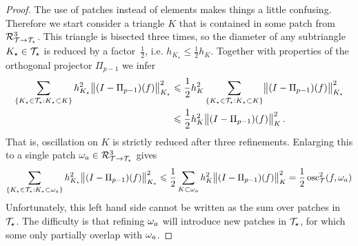 \documentclass[thesis.tex]{subfiles}
\begin{document}
\begin{proof}

  The use of patches instead of elements makes things a little confusing. %
  Therefore we start consider a triangle $K$ that is contained in some patch from $\mathcal{R}^3_{\mathcal{T} \to \mathcal{T}_\star}$.
  This triangle is bisected three times, so the diameter of any subtriangle $K_\star \in \mathcal{T}_\star$  is reduced by a factor~$\frac{1}{2}$, i.e. $h_{K_\star} \leq \frac{1}{2} h_K$.
  Together with properties of the orthogonal projector $\Pi_{p-1}$ we infer
  \begin{equation}
    \label{eq:strictosc}
  \begin{aligned}
    \sum_{\set{K_\star \in \mathcal{T}_\star : K_\star \subset K}} h^2_{K_\star} \norm{(I - \Pi_{p-1})(f)}^2_{K_\star} &\leqslant \frac{1}{2}h^2_K \sum_{\set{K_\star \in \mathcal{T}_\star : K_\star \subset K}} \norm{(I - \Pi_{p-1})(f)}^2_{K_\star} \\
    &\leqslant \frac{1}{2} h^2_K \norm{(I - \Pi_{p-1})(f)}^2_K.
  \end{aligned}
  \end{equation}
  That is, oscillation on $K$ is strictly reduced after three refinements. Enlarging this to a single patch $\omega_a \in \mathcal{R}^3_{\mathcal{T} \to \mathcal{T}_\star}$ gives
  \begin{equation}
    \label{eq:singlepatch}
    \sum_{\set{K_\star \in \mathcal{T}_\star : K_\star \subset \omega_a}} h^2_{K_\star} \norm{(I-\Pi_{p-1})(f)}^2_{K_\star} \leqslant \frac{1}{2} \sum_{K \subset \omega_a} h_K^2\norm{(I-\Pi_{p-1})(f)}_K^2 = \frac{1}{2} \operatorname{osc}_{\mathcal{T}}^2(f, \omega_a) 
  \end{equation}
  Unfortunately, this left hand side cannot be written as the sum over patches in $\mathcal{T}_\star$.
  The difficulty is that refining $\omega_a$ will introduce new patches in $\mathcal{T}_\star$, for which 
  some only partially overlap with $\omega_a$. 
  

\end{proof}
\end{document}
